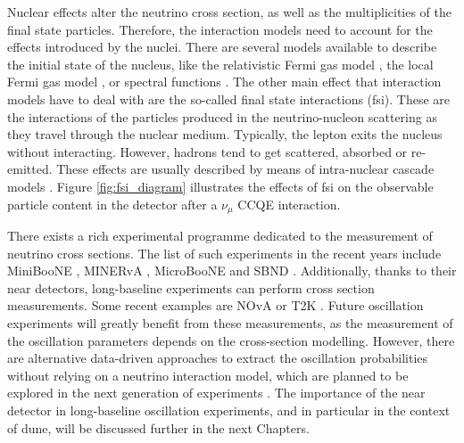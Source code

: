 Nuclear effects alter the neutrino cross section, as well as the multiplicities of the final state particles. Therefore, the interaction models need to account for the effects introduced by the nuclei. There are several models available to describe the initial state of the nucleus, like the relativistic Fermi gas model \cite{Smith1972}, the local Fermi gas model \cite{Chiang1989}, or spectral functions \cite{Nakamura2002}. The other main effect that interaction models have to deal with are the so-called final state interactions (\gls{fsi}). These are the interactions of the particles produced in the neutrino-nucleon scattering as they travel through the nuclear medium. Typically, the lepton exits the nucleus without interacting. However, hadrons tend to get scattered, absorbed or re-emitted. These effects are usually described by means of intra-nuclear cascade models \cite{Nikolakopoulos2022}. Figure \ref{fig:fsi_diagram} illustrates the effects of \gls{fsi} on the observable particle content in the detector after a $\nu_{\mu}$ CCQE interaction.

There exists a rich experimental programme dedicated to the measurement of neutrino cross sections. The list of such experiments in the recent years include MiniBooNE \cite{MiniBooNE2010}, MINERvA \cite{MINERvA2016}, MicroBooNE \cite{MicroBooNE2021} and SBND \cite{McConkey2018}. Additionally, thanks to their near detectors, long-baseline experiments can perform cross section measurements. Some recent examples are NOvA \cite{Nova2021} or T2K \cite{T2K2019}. Future oscillation experiments will greatly benefit from these measurements, as the measurement of the oscillation parameters depends on the cross-section modelling. However, there are alternative data-driven approaches to extract the oscillation probabilities without relying on a neutrino interaction model, which are planned to be explored in the next generation of experiments \cite{Scott2015,Hasnip2023}. The importance of the near detector in long-baseline oscillation experiments, and in particular in the context of \gls{dune}, will be discussed further in the next Chapters.